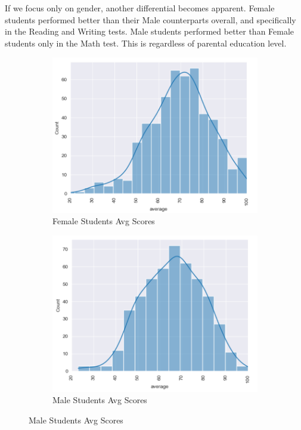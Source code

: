 \documentclass[doc]{apa6} %
\begin{document}
If we focus only on gender, another differential becomes apparent. Female students performed better than their Male counterparts overall, and specifically in the Reading and Writing tests.  Male students performed better than Female students only in the Math test. This is regardless of parental education level.
\begin{figure}[H]
    \centering
    \caption{Average Standardized Scores by Gender}
    \begin{subfigure}[b]{0.45\textwidth}
        \includegraphics[width=\linewidth]{FemaleAverageScoreCurve.png}
        \caption{Female Students Avg Scores}
        \label{fig:FemaleAvg}
    \end{subfigure}
    \begin{subfigure}[b]{0.45\textwidth}
        \includegraphics[width=\linewidth]{MaleAverageScoreCurve.png}
        \caption{Male Students Avg Scores}
        \label{fig:MaleAvg}
    \end{subfigure}
\end{figure}
\end{document}
